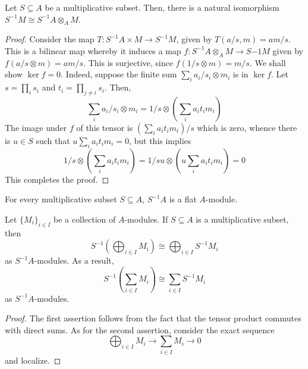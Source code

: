 \begin{proposition}
    Let $S\subseteq A$ be a multiplicative subset. Then, there is a natural isomorphism $S^{-1}M\cong S^{-1}A\otimes_A M$.
\end{proposition}
\begin{proof}
    Consider the map $T: S^{-1}A\times M\to S^{-1}M$, given by $T(a/s, m) = am/s$. This is a bilinear map whereby it induces a map $f: S^{-1}A\otimes_A M\to S{-1}M$ given by $f(a/s\otimes m) = am/s$. This is surjective, since $f(1/s\otimes m) = m/s$. We shall show $\ker f = 0$. Indeed, suppose the finite sum $\sum_i a_i/s_i\otimes m_i$ is in $\ker f$. Let $s = \prod_i s_i$ and $t_i = \prod_{j\ne i}s_i$. Then, 
    \begin{equation*}
        \sum_{i}a_i/s_i\otimes m_i = 1/s\otimes\left(\sum_i a_it_im_i\right)
    \end{equation*}
    The image under $f$ of this tensor is $(\sum_i a_it_im_i)/s$ which is zero, whence there is $u\in S$ such that $u\sum_i a_it_im_i = 0$, but this implies 
    \begin{equation*}
        1/s\otimes\left(\sum_i a_it_im_i\right) = 1/su\otimes\left(u\sum_i a_it_im_i\right) = 0
    \end{equation*}
    This completes the proof.
\end{proof}
\begin{corollary}
    For every multiplicative subset $S\subseteq A$, $S^{-1}A$ is a flat $A$-module.
\end{corollary}
\begin{corollary}
    Let $\{M_i\}_{i\in I}$ be a collection of $A$-modules. If $S\subseteq A$ is a multiplicative subset, then 
    \begin{equation*}
        S^{-1}\left(\bigoplus_{i\in I} M_i\right)\cong\bigoplus_{i\in I} S^{-1}M_i
    \end{equation*}
    as $S^{-1}A$-modules. As a result, 
    \begin{equation*}
        S^{-1}\left(\sum_{i\in I} M_i\right)\cong\sum_{i\in I} S^{-1}M_i
    \end{equation*}
    as $S^{-1}A$-modules.
\end{corollary}
\begin{proof}
    The first assertion follows from the fact that the tensor product commutes with direct sums. As for the second assertion, consider the exact sequence 
    \begin{equation*}
        \bigoplus_{i\in I} M_i\longrightarrow\sum_{i\in I} M_i\longrightarrow 0
    \end{equation*}
    and localize.
\end{proof}

